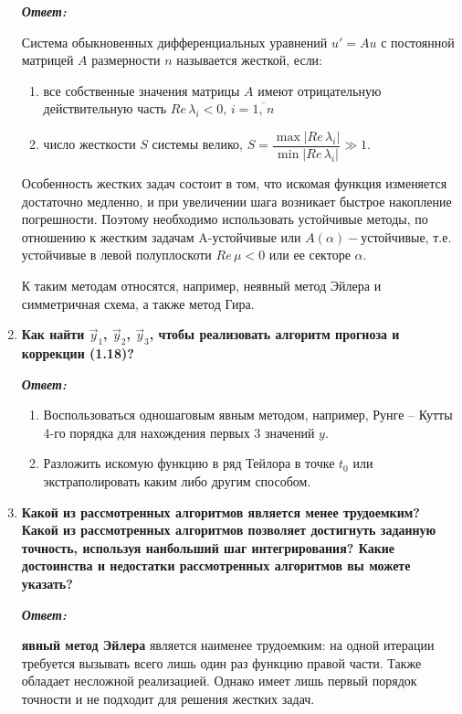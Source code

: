 \documentclass[12pt, a4paper]{article}
\newcommand{\abs}[1]{\lvert #1 \rvert}
\begin{document}
\begin{enumerate}
		\textit{\textbf{Ответ:}}

		Система обыкновенных дифференциальных уравнений $u' = Au$ с постоянной матрицей $A$ размерности $n$ называется жесткой, если: 
		\begin{enumerate}
			\item все собственные значения матрицы $A$ имеют отрицательную действительную часть $Re \, \lambda_i < 0, \, i = \overline{1, \,n}$
			\item число жесткости $S$ системы велико, $S = \dfrac{\max \abs{Re \, \lambda_i}}{\min \abs{Re \, \lambda_i}} \gg 1$.
		\end{enumerate} 

		Особенность жестких задач состоит в том, что искомая функция изменяется достаточно медленно, и при увеличении шага возникает быстрое накопление погрешности. Поэтому необходимо использовать устойчивые методы, по отношению к жестким задачам A-устойчивые или $A(\alpha)-$устойчивые, т.е. устойчивые в левой полуплоскоти $Re \, \mu < 0$ или ее секторе $\alpha$.

		К таким методам относятся, например, неявный метод Эйлера и симметричная схема, а также метод Гира.
		
		\item \textbf{Как найти $\vec{y}_1$, $\vec{y}_2$, $\vec{y}_3$, чтобы реализовать алгоритм прогноза и коррекции (1.18)?}
		\vspace*{0.2cm}
		
		\textit{\textbf{Ответ:}}
		
		\begin{enumerate}
			\item Воспользоваться одношаговым явным методом, например, Рунге -- Кутты 4-го порядка для нахождения первых 3 значений $y$.
			\item Разложить искомую функцию в ряд Тейлора в точке $t_0$ или экстраполировать каким либо другим способом. 
		\end{enumerate}
		
		\item \textbf{ Какой из рассмотренных алгоритмов является менее трудоемким? Какой из рассмотренных алгоритмов позволяет достигнуть заданную точность, используя наибольший шаг интегрирования? Какие достоинства и недостатки рассмотренных алгоритмов вы можете указать?}
		\vspace*{0.2cm}
		
		\textit{\textbf{Ответ:}}

		\textbf{явный метод Эйлера} является наименее трудоемким: на одной итерации требуется вызывать всего лишь один раз функцию правой части. Также обладает несложной реализацией. Однако имеет лишь первый порядок точности и не подходит для решения жестких задач.


\end{enumerate}
\end{document}
